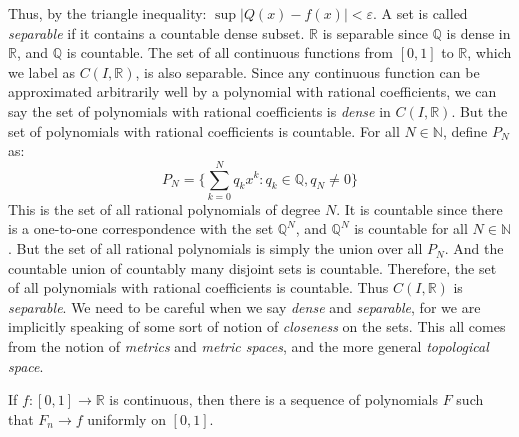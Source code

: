             Thus, by the triangle inequality:
            $\sup|Q(x)-f(x)|<\varepsilon$. A set is called
            \textit{separable} if it
            contains a countable dense subset. $\mathbb{R}$
            is separable since $\mathbb{Q}$ is dense in
            $\mathbb{R}$, and $\mathbb{Q}$ is countable.
            The set of all continuous functions from
            $[0,1]$ to $\mathbb{R}$, which we label as
            $C(I,\mathbb{R})$, is also separable.
            Since any continuous function can be approximated
            arbitrarily well by a polynomial with rational
            coefficients, we can say the set of polynomials
            with rational coefficients is \textit{dense} in
            $C(I,\mathbb{R})$. But the set of polynomials with
            rational coefficients is countable. For all
            $N\in\mathbb{N}$, define $P_{N}$ as:
            \begin{equation}
                    P_{N}=\Big\{\sum_{k=0}^{N}
                    q_{k}x^{k}:q_{k}\in\mathbb{Q},
                    q_{N}\ne{0}\Big\}
                \end{equation}
            This is the set of all rational polynomials
            of degree $N$. It is countable since there is
            a one-to-one correspondence with
            the set $\mathbb{Q}^{N}$, and $\mathbb{Q}^{N}$
            is countable for all $N\in\mathbb{N}$. But the
            set of all rational polynomials is simply the
            union over all $P_{N}$. And the countable union
            of countably many disjoint sets is countable.
            Therefore, the set of all polynomials with
            rational coefficients is countable. Thus
            $C(I,\mathbb{R})$ is \textit{separable}. We need
            to be careful when we say \textit{dense} and
            \textit{separable}, for we are implicitly speaking
            of some sort of notion of \textit{closeness} on the
            sets. This all comes from the notion of
            \textit{metrics} and \textit{metric spaces},
            and the more general \textit{topological space}.
            \begin{theorem}
                \label{thm:Funct:Weierstrass_%
                       Approx_on_unit_interval}
                If $f:[0,1]\rightarrow\mathbb{R}$ is
                continuous, then there is a sequence
                of polynomials $F$ such that
                $F_{n}\rightarrow{f}$ uniformly on $[0,1]$.
            \end{theorem}
